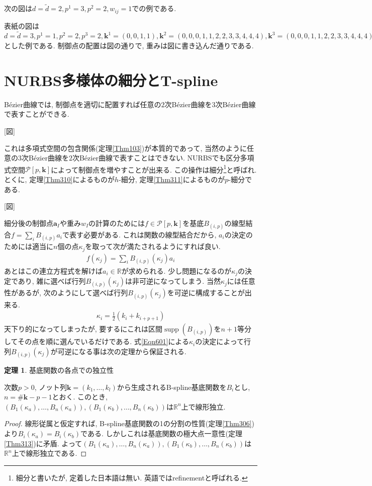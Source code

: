 \documentclass{jsarticle}
\newcommand\setR{\mathbb{R}}
\newcommand\Pare[1]{\left(#1\right)}
\DeclareMathOperator{\supp}{supp}
\theoremstyle{definition}%
\newtheorem{thm}{定理}
\begin{document}
次の図は$d=\tilde{d}=2, p^1=3, p^2=2, w_{ij}=1$での例である.

表紙の図は$d=\tilde{d}=3, p^1=1, p^2=2, p^3=2, \bm{k}^1=(0,0,1,1), \bm{k}^2=(0,0,0,1,1,2,2,3,3,4,4,4), \bm{k}^3=(0,0,0,1,1,2,2,3,3,4,4,4)$とした例である.
制御点の配置は図の通りで, 重みは図に書き込んだ通りである.



\newpage
\section{NURBS多様体の細分とT-spline}
B\'{e}zier曲線では, 制御点を適切に配置すれば任意の$2$次B\'{e}zier曲線を$3$次B\'{e}zier曲線で表すことができる.

[図]

これは多項式空間の包含関係(定理\ref{Thm103})が本質的であって, 当然のように任意の$3$次B\'{e}zier曲線を$2$次B\'{e}zier曲線で表すことはできない.
NURBSでも区分多項式空間$\mathcal{P}[p,\bm{k}]$によって制御点を増やすことが出来る.
この操作は細分\footnote{細分と書いたが, 定着した日本語は無い. 英語ではrefinementと呼ばれる.}と呼ばれ. とくに, 定理\ref{Thm310}によるものが$h$-細分, 定理\ref{Thm311}によるものが$p$-細分である.

[図]

細分後の制御点$\bm{a}_I$や重み$w_I$の計算のためには$f\in \mathcal{P}[p,\bm{k}]$を基底$B_{(i,p)}$の線型結合$f=\sum_iB_{(i,p)}a_i$で表す必要がある.
これは関数の線型結合だから, $a_i$の決定のためには適当に$n$個の点$\kappa_j$を取って次が満たされるようにすれば良い.
\begin{align}
    f(\kappa_j)=\sum_{i}B_{(i,p)}(\kappa_j)a_i
\end{align}
あとはこの連立方程式を解けば$a_i\in\setR$が求められる.
少し問題になるのが$\kappa_j$の決定であり, 雑に選べば行列$B_{(i,p)}(\kappa_j)$は非可逆になってしまう.
当然$\kappa_j$には任意性があるが, 次のようにして選べば行列$B_{(i,p)}(\kappa_j)$を可逆に構成することが出来る.
\begin{align}
    \label{Eqn601}
    \kappa_i=\frac{1}{2}\Pare{k_i+k_{i+p+1}}
\end{align}
天下り的になってしまったが, 要するにこれは区間$\supp(B_{(i,p)})$を$n+1$等分してその点を順に選んでいるだけである.
式\eqref{Eqn601}による$\kappa_i$の決定によって行列$B_{(i,p)}(\kappa_j)$が可逆になる事は次の定理から保証される.
\begin{screen}
	\begin{thm}
        \label{Thm601}
		基底関数の各点での独立性

        次数$p>0$, ノット列$\bm{k}=(k_1,\dots,k_l)$から生成されるB-spline基底関数を$B_i$とし, $n=\# \bm{k}-p-1$とおく.
        このとき, $\Pare{B_1(\kappa_a),\dots,B_n(\kappa_a)}, \Pare{B_1(\kappa_b),\dots,B_n(\kappa_b)}$は$\setR^n$上で線形独立.
	\end{thm}
\end{screen}
\begin{proof}
    線形従属と仮定すれば, B-spline基底関数の1の分割の性質(定理\ref{Thm306})より$B_i(\kappa_a)=B_i(\kappa_b)$である.
    しかしこれは基底関数の極大点一意性(定理\ref{Thm313})に矛盾.
    よって$\Pare{B_1(\kappa_a),\dots,B_n(\kappa_a)}, \Pare{B_1(\kappa_b),\dots,B_n(\kappa_b)}$は$\setR^n$上で線形独立である.
\end{proof}
\end{document}
